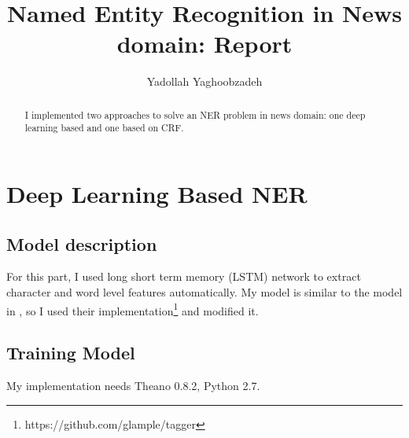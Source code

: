 \documentclass{llncs}
\begin{document}
\title{Named Entity Recognition in News domain: Report}
%

\author{Yadollah Yaghoobzadeh}
%
%
%

\maketitle              %

\begin{abstract}
I implemented two approaches to solve an NER problem in news domain:
one deep learning based and one based on CRF. 

\end{abstract}
%
\section{Deep Learning Based NER}
%
\subsection{Model description}
For this part, I used 
long short term memory (LSTM) network
to extract character and word level features
automatically. 
My model is similar to the model in \cite{tagger}, 
so I used their implementation\footnote{https://github.com/glample/tagger} and modified it.

\subsection{Training Model}
My implementation needs Theano 0.8.2, Python 2.7.



%
\end{document}
